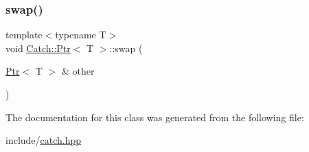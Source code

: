 \mbox{\label{class_catch_1_1_ptr_a172bf8b4e71e26a5a4d92f5b02158b50}} 
\subsubsection{\texorpdfstring{swap()}{swap()}}
{\footnotesize\ttfamily template$<$typename T$>$ \\
void \mbox{\hyperlink{class_catch_1_1_ptr}{Catch\+::\+Ptr}}$<$ T $>$\+::swap (\begin{DoxyParamCaption}\item[{\mbox{\hyperlink{class_catch_1_1_ptr}{Ptr}}$<$ T $>$ \&}]{other }\end{DoxyParamCaption})\hspace{0.3cm}{\ttfamily [inline]}}



The documentation for this class was generated from the following file\+:\begin{DoxyCompactItemize}
\item 
include/\mbox{\hyperlink{catch_8hpp}{catch.\+hpp}}\end{DoxyCompactItemize}
